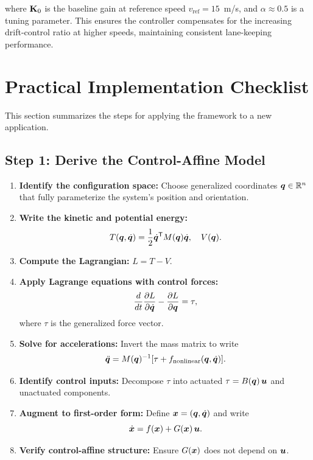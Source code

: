where $\mathbf{K}_0$ is the baseline gain at reference speed $v_{\text{ref}} = 15$~m/s,
and $\alpha \approx 0.5$ is a tuning parameter. This ensures the controller compensates
for the increasing drift-control ratio at higher speeds, maintaining consistent lane-keeping
performance.

\section{Practical Implementation Checklist}

This section summarizes the steps for applying the framework to a new application.

\subsection{Step 1: Derive the Control-Affine Model}

\begin{enumerate}
\item \textbf{Identify the configuration space:} Choose generalized coordinates $\bm{q} \in \mathbb{R}^n$
that fully parameterize the system's position and orientation.

\item \textbf{Write the kinetic and potential energy:}
\begin{equation}
T(\bm{q}, \dot{\bm{q}}) = \frac{1}{2}\dot{\bm{q}}^{\mathsf{T}} M(\bm{q})\dot{\bm{q}}, \quad V(\bm{q}).
\end{equation}

\item \textbf{Compute the Lagrangian:} $L = T - V$.

\item \textbf{Apply Lagrange equations with control forces:}
\begin{equation}
\frac{d}{dt}\frac{\partial L}{\partial\dot{\bm{q}}} - \frac{\partial L}{\partial\bm{q}} = \tau,
\end{equation}
where $\tau$ is the generalized force vector.

\item \textbf{Solve for accelerations:} Invert the mass matrix to write
\begin{equation}
\ddot{\bm{q}} = M(\bm{q})^{-1}[\tau + f_{\text{nonlinear}}(\bm{q}, \dot{\bm{q}})].
\end{equation}

\item \textbf{Identify control inputs:} Decompose $\tau$ into actuated $\tau = B(\bm{q})\,\bm{u}$ and
unactuated components.

\item \textbf{Augment to first-order form:} Define $\bm{x} = (\bm{q}, \dot{\bm{q}})$ and write
\begin{equation}
\dot{\bm{x}} = f(\bm{x}) + G(\bm{x})\,\bm{u}.
\end{equation}

\item \textbf{Verify control-affine structure:} Ensure $G(\bm{x})$ does not depend on $\bm{u}$.
\end{enumerate}

